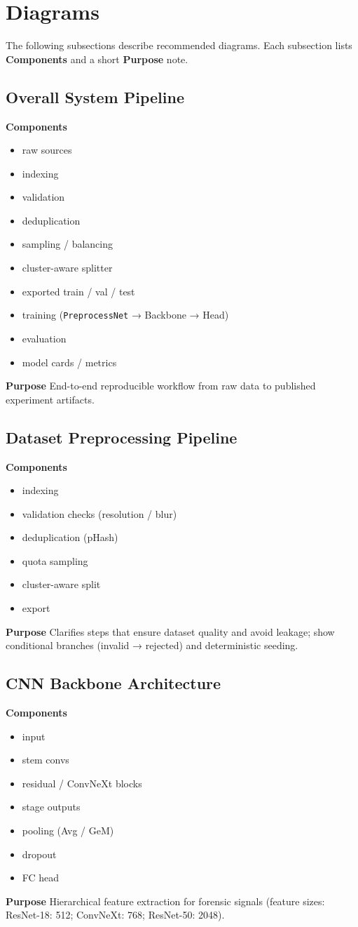 \documentclass[11pt]{report}
\begin{document}
\section{Diagrams}
The following subsections describe recommended diagrams. Each subsection lists
\textbf{Components} and a short \textbf{Purpose} note.

\subsection{Overall System Pipeline}
\textbf{Components}
\begin{itemize}
  \item raw sources
  \item indexing
  \item validation
  \item deduplication
  \item sampling / balancing
  \item cluster-aware splitter
  \item exported train / val / test
  \item training (\texttt{PreprocessNet} → Backbone → Head)
  \item evaluation
  \item model cards / metrics
\end{itemize}
\textbf{Purpose}
End-to-end reproducible workflow from raw data to published experiment artifacts.
 
\subsection{Dataset Preprocessing Pipeline}
\textbf{Components}
\begin{itemize}
  \item indexing
  \item validation checks (resolution / blur)
  \item deduplication (pHash)
  \item quota sampling
  \item cluster-aware split
  \item export
\end{itemize}
\textbf{Purpose}
Clarifies steps that ensure dataset quality and avoid leakage; show conditional branches (invalid → rejected) and deterministic seeding.

\subsection{CNN Backbone Architecture}
\textbf{Components}
\begin{itemize}
  \item input
  \item stem convs
  \item residual / ConvNeXt blocks
  \item stage outputs
  \item pooling (Avg / GeM)
  \item dropout
  \item FC head
\end{itemize}
\textbf{Purpose}
Hierarchical feature extraction for forensic signals (feature sizes: ResNet-18: 512; ConvNeXt: 768; ResNet-50: 2048).
\end{document}

